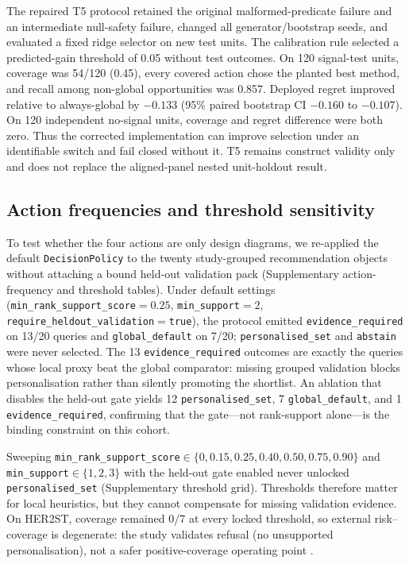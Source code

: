 \documentclass[12pt]{article}
\begin{document}
The repaired T5 protocol retained the original malformed-predicate failure and
an intermediate null-safety failure, changed all generator/bootstrap seeds,
and evaluated a fixed ridge selector on new test units. The calibration rule
selected a predicted-gain threshold of 0.05 without test outcomes. On 120
signal-test units, coverage was 54/120 (0.45), every covered action chose the
planted best method, and recall among non-global opportunities was 0.857.
Deployed regret improved relative to always-global by \(-0.133\) (95\% paired
bootstrap CI \(-0.160\) to \(-0.107\)). On 120 independent no-signal units,
coverage and regret difference were both zero. Thus the corrected
implementation can improve selection under an identifiable switch and fail
closed without it. T5 remains construct validity only and does not replace the
aligned-panel nested unit-holdout result.

\subsection{Action frequencies and threshold sensitivity}

To test whether the four actions are only design diagrams, we re-applied the
default \texttt{DecisionPolicy} to the twenty study-grouped recommendation
objects without attaching a bound held-out validation pack
(Supplementary action-frequency and threshold tables). Under default settings
(\texttt{min\_rank\_support\_score}$=0.25$, \texttt{min\_support}$=2$,
\texttt{require\_heldout\_validation}$=$\texttt{true}), the protocol emitted
\texttt{evidence\_required} on 13/20 queries and \texttt{global\_default} on
7/20; \texttt{personalised\_set} and \texttt{abstain} were never selected.
The 13 \texttt{evidence\_required} outcomes are exactly the queries whose
local proxy beat the global comparator: missing grouped validation blocks
personalisation rather than silently promoting the shortlist. An ablation that
disables the held-out gate yields 12 \texttt{personalised\_set}, 7
\texttt{global\_default}, and 1 \texttt{evidence\_required}, confirming that
the gate---not rank-support alone---is the binding constraint on this cohort.

Sweeping \texttt{min\_rank\_support\_score}$\in\{0,0.15,0.25,0.40,0.50,0.75,0.90\}$
and \texttt{min\_support}$\in\{1,2,3\}$ with the held-out gate enabled never
unlocked \texttt{personalised\_set} (Supplementary threshold grid).
Thresholds therefore matter for local heuristics, but they cannot compensate
for missing validation evidence. On HER2ST, coverage remained 0/7 at every
locked threshold, so external risk--coverage is degenerate: the study
validates refusal (no unsupported personalisation), not a safer positive-coverage
operating point \citep{geifman2017selective}.
\end{document}
